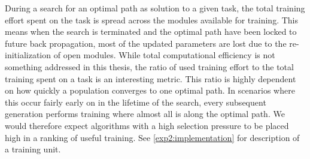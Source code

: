 During a search for an optimal path as solution to a given task, the total training effort spent on the task is spread across the modules available for training. This means when the search is terminated and the optimal path have been locked to future back propagation, most of the updated parameters are lost due to the re-initialization of open modules. While total computational efficiency is not something addressed in this thesis, the ratio of used training effort to the total training spent on a task is an interesting metric. This ratio is highly dependent on how quickly a population converges to one optimal path. In scenarios where this occur fairly early on in the lifetime of the search, every subsequent generation performs training where almost all is along the optimal path. We would therefore expect algorithms with a high selection pressure to be placed high in a ranking of useful training. See \ref{exp2:implementation} for description of a training unit. 
